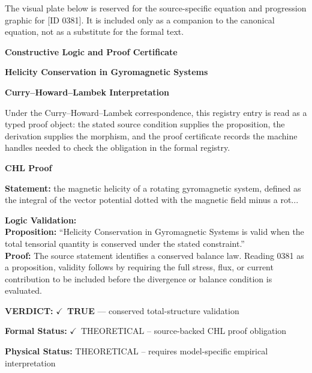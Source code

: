 \begingroup\footnotesize\sloppy
The visual plate below is reserved for the source-specific equation and progression graphic for [ID 0381]. It is included only as a companion to the canonical equation, not as a substitute for the formal text.
\par\endgroup
\ifTZPDarkEdition
{}
\fi

\clearpage
\begingroup\tzpsupportsetup
\noindent\textbf{\fontsize{10.8pt}{12.8pt}\selectfont [ID 0381] Constructive Logic and Proof Certificate}\par
\noindent\textbf{\fontsize{10pt}{12pt}\selectfont Helicity Conservation in Gyromagnetic Systems}\par
\vspace{0.45em}
\begingroup
\footnotesize
\setlength{\parskip}{0.22em}
\setlength{\parindent}{0pt}
\noindent\textbf{Curry--Howard--Lambek Interpretation}\par
Under the Curry--Howard--Lambek correspondence, this registry entry is read as a typed proof
object: the stated source condition supplies the proposition, the derivation supplies the
morphism, and the proof certificate records the machine handles needed to check the obligation
in the formal registry.

\vspace{0.45em}
\noindent\textbf{CHL Proof}\par
\textbf{Statement:} the magnetic helicity of a rotating gyromagnetic system, defined as the integral of the
vector potential dotted with the magnetic field minus a rot...

\textbf{Logic Validation:}\\
\textbf{Proposition:} ``Helicity Conservation in Gyromagnetic Systems is valid when the total tensorial quantity
is conserved under the stated constraint.''\\
\textbf{Proof:} The source statement identifies a conserved balance law. Reading 0381 as a proposition,
validity follows by requiring the full stress, flux, or current contribution to be
included before the divergence or balance condition is evaluated.

\textbf{VERDICT:} \ensuremath{\checkmark}\ \textbf{TRUE} --- conserved total-structure validation

\textbf{Formal Status:} \ensuremath{\checkmark}\ THEORETICAL -- source-backed CHL proof obligation

\textbf{Physical Status:} THEORETICAL -- requires model-specific empirical interpretation
\par\vspace{0.45em}
\par
\ifTZPDarkEdition
{}
\fi
\endgroup
\endgroup
